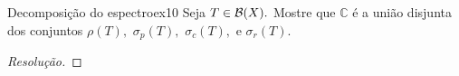 \begin{exercício}{Decomposição do espectro}{ex10}
  Seja \(T \in \mathcal{B}(X).\) Mostre que \(\mathbb{C}\) é a união disjunta dos conjuntos \(\rho(T),\) \(\sigma_p(T),\) \(\sigma_c(T),\) e \(\sigma_r(T).\)
\end{exercício}
\begin{proof}[Resolução]

\end{proof}
